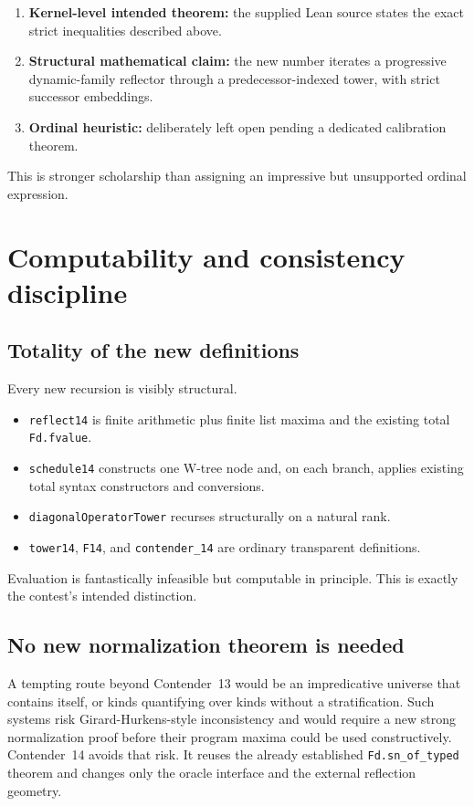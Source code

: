 \documentclass[11pt]{article}
\theoremstyle{definition}
\theoremstyle{remark}
\newcommand{\lean}[1]{\texttt{#1}}
\begin{document}
\begin{enumerate}[leftmargin=*]
\item \textbf{Kernel-level intended theorem:} the supplied Lean source states
  the exact strict inequalities described above.
\item \textbf{Structural mathematical claim:} the new number iterates a
  progressive dynamic-family reflector through a predecessor-indexed tower,
  with strict successor embeddings.
\item \textbf{Ordinal heuristic:} deliberately left open pending a dedicated
  calibration theorem.
\end{enumerate}

This is stronger scholarship than assigning an impressive but unsupported
ordinal expression.

\section{Computability and consistency discipline}

\subsection{Totality of the new definitions}

Every new recursion is visibly structural.

\begin{itemize}[leftmargin=*]
\item \lean{reflect14} is finite arithmetic plus finite list maxima and the
  existing total \lean{Fd.fvalue}.
\item \lean{schedule14} constructs one W-tree node and, on each branch, applies
  existing total syntax constructors and conversions.
\item \lean{diagonalOperatorTower} recurses structurally on a natural rank.
\item \lean{tower14}, \lean{F14}, and \lean{contender\_14} are ordinary
  transparent definitions.
\end{itemize}

Evaluation is fantastically infeasible but computable in principle.  This is
exactly the contest's intended distinction.

\subsection{No new normalization theorem is needed}

A tempting route beyond Contender~13 would be an impredicative universe that
contains itself, or kinds quantifying over kinds without a stratification.  Such
systems risk Girard-Hurkens-style inconsistency and would require a new strong
normalization proof before their program maxima could be used constructively.
Contender~14 avoids that risk.  It reuses the already established
\lean{Fd.sn\_of\_typed} theorem and changes only the oracle interface and the
external reflection geometry.
\end{document}
